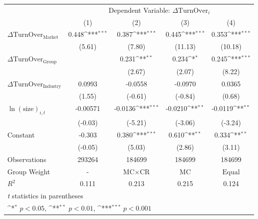 {
\def\sym#1{\ifmmode^{#1}\else\(^{#1}\)\fi}
\begin{tabular}{l*{4}{c}}
\hline\hline
                    &\multicolumn{4}{c}{Dependent Variable: $\Delta \text{TurnOver}_{i} $ }                 \\\cmidrule(lr){2-5}
                    &\multicolumn{1}{c}{(1)}         &\multicolumn{1}{c}{(2)}         &\multicolumn{1}{c}{(3)}         &\multicolumn{1}{c}{(4)}         \\
\hline
 $ \Delta \text{TurnOver}_{\text{Market}} $ &       0.448\sym{***}&       0.387\sym{***}&       0.445\sym{***}&       0.353\sym{***}\\
                    &      (5.61)         &      (7.80)         &     (11.13)         &     (10.18)         \\
[1em]
 $ \Delta \text{TurnOver}_{\text{Group}} $ &                     &       0.231\sym{**} &       0.234\sym{*}  &       0.245\sym{***}\\
                    &                     &      (2.67)         &      (2.07)         &      (8.22)         \\
[1em]
 $ \Delta \text{TurnOver}_{\text{Industry}} $ &      0.0993         &     -0.0558         &     -0.0970         &      0.0365         \\
                    &      (1.55)         &     (-0.61)         &     (-0.84)         &      (0.68)         \\
[1em]
 $ \ln(\text{size})_{i,t} $ &    -0.00571         &     -0.0136\sym{***}&     -0.0210\sym{**} &     -0.0119\sym{**} \\
                    &     (-0.03)         &     (-5.21)         &     (-3.06)         &     (-3.24)         \\
[1em]
Constant            &      -0.303         &       0.380\sym{***}&       0.610\sym{**} &       0.334\sym{**} \\
                    &     (-0.05)         &      (5.03)         &      (2.86)         &      (3.11)         \\
\hline
Observations        &      293264         &      184699         &      184699         &      184699         \\
Group Weight        &           -         & $ \text{MC} \times \text{CR} $          & $ \text{MC} $          &$ \text{Equal} $         \\
$ R^2 $             &       0.111         &       0.213         &       0.215         &       0.124         \\
\hline\hline
\multicolumn{5}{l}{\footnotesize \textit{t} statistics in parentheses}\\
\multicolumn{5}{l}{\footnotesize \sym{*} \(p<0.05\), \sym{**} \(p<0.01\), \sym{***} \(p<0.001\)}\\
\end{tabular}
}
